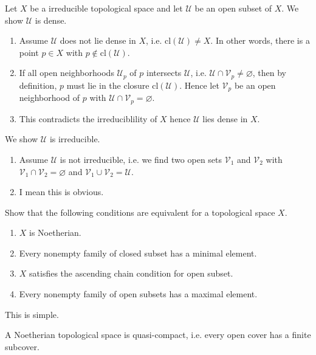 \begin{solution}
    Let \(X\) be a irreducible topological space and let \(\mathcal{U}\) be an open subset of \(X\). We show \(\mathcal{U}\) is dense.
    \begin{enumerate}
        \item Assume \(\mathcal{U}\) does not lie dense in \(X\), i.e. \(\text{cl}(\mathcal{U}) \neq X\). In other words, there is a point \(p \in X\) with \(p \not\in \text{cl}(\mathcal{U})\).
        \item If all open neighborhoods \(\mathcal{U}_p\) of \(p\) intersects \(\mathcal{U}\), i.e. \(\mathcal{U} \cap \mathcal{V}_p \neq \varnothing\), then by definition, \(p\) must lie in the closure \(\text{cl}(\mathcal{U})\). Hence let \(\mathcal{V}_p\) be an open neighborhood of \(p\) with \(\mathcal{U} \cap \mathcal{V}_p = \varnothing\).
        \item This contradicts the irreduciblility of \(X\) hence \(\mathcal{U}\) lies dense in \(X\).
    \end{enumerate}
    We show \(\mathcal{U}\) is irreducible.
    \begin{enumerate}
        \item Assume \(\mathcal{U}\) is not irreducible, i.e. we find two open sets \(\mathcal{V}_1\) and \(\mathcal{V}_2\) with \(\mathcal{V}_1 \cap \mathcal{V}_2 = \varnothing\) and \(\mathcal{V}_1 \cup \mathcal{V}_2 = \mathcal{U}\).
        \item I mean this is obvious.
    \end{enumerate}
\end{solution}
%
%
%
\begin{exercise}[1.7.]
    Show that the following conditions are equivalent for a topological space \(X\).
    \begin{enumerate}
        \item \(X\) is Noetherian.
        \item Every nonempty family of closed subset has a minimal element.
        \item \(X\) satisfies the ascending chain condition for open subset.
        \item Every nonempty family of open subsets has a maximal element.
    \end{enumerate}
\end{exercise}
\begin{solution}
    This is simple.
\end{solution}
\begin{exercise}[1.7. (b)]
    A Noetherian topological space is quasi-compact, i.e. every open cover has a finite subcover.
\end{exercise}
